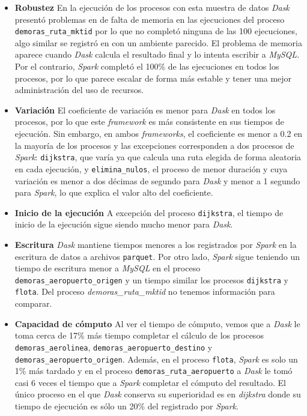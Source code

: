 \begin{itemize}

	\item \textbf{Robustez} En la ejecución de los procesos con esta muestra de datos \textit{Dask} presentó problemas en de falta de memoria en las ejecuciones del proceso \texttt{demoras\_ruta\_mktid} por lo que no completó ninguna de las 100 ejecuciones, algo similar se registró en \cite{comparative-evolution} con un ambiente parecido. El problema de memoria aparece cuando \textit{Dask} calcula el resultado final y lo intenta escribir a \textit{MySQL}. Por el contrario, \textit{Spark} completó el 100\% de las ejecuciones en todos los procesos, por lo que parece escalar de forma más estable y tener una mejor administración del uso de recursos.
	
	\item \textbf{Variación} El coeficiente de variación es menor para \textit{Dask} en todos los procesos, por lo que este \textit{framework} es más consistente en sus tiempos de ejecución. Sin embargo, en ambos \textit{frameworks}, el coeficiente es menor a 0.2 en la mayoría de los procesos y las excepciones corresponden a dos procesos de \textit{Spark}: \texttt{dijkstra}, que varía ya que calcula una ruta elegida de forma aleatoria en cada ejecución, y \texttt{elimina\_nulos}, el proceso de menor duración y cuya variación es menor a dos décimas de segundo para \textit{Dask} y menor a 1 segundo para \textit{Spark}, lo que explica el valor alto del coeficiente.
	
	\item \textbf{Inicio de la ejecución} A excepción del proceso \texttt{dijkstra}, el tiempo de inicio de la ejecución sigue siendo mucho menor para \textit{Dask}.
	
	\item \textbf{Escritura} \textit{Dask} mantiene tiempos menores a los registrados por \textit{Spark} en la escritura de datos a archivos \texttt{parquet}. Por otro lado, \textit{Spark} sigue teniendo un tiempo de escritura menor a \textit{MySQL} en el proceso \texttt{demoras\_aeropuerto\_origen} y un tiempo similar los procesos \texttt{dijkstra} y \texttt{flota}. Del proceso \textit{demoras\_ruta\_mktid} no tenemos información para comparar. 
	
	\item \textbf{Capacidad de cómputo} Al ver el tiempo de cómputo, vemos que a \textit{Dask} le toma cerca de 17\% más tiempo completar el cálculo de los procesos \texttt{demoras\_aerolinea}, \texttt{demoras\_aeropuerto\_destino} y \texttt{demoras\_aeropuerto\_origen}. Además, en el proceso \texttt{flota}, \textit{Spark} es solo un 1\% más tardado y en el proceso \texttt{demoras\_ruta\_aeropuerto} a \textit{Dask} le tomó casi 6 veces el tiempo que a \textit{Spark} completar el cómputo del resultado. El único proceso en el que \textit{Dask} conserva su superioridad es en \textit{dijkstra} donde su tiempo de ejecución es sólo un 20\% del registrado por \textit{Spark}. 
	

\end{itemize}
